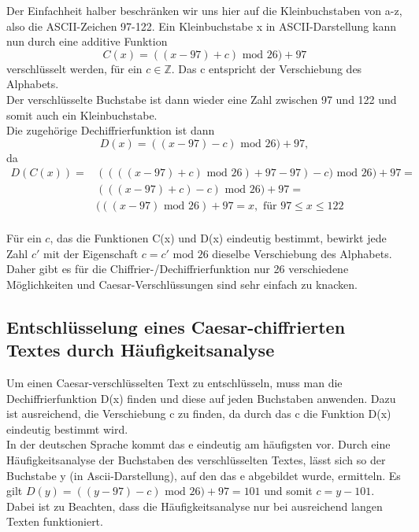 \documentclass[ngerman,12pt]{article}
\def\mod{\mbox{ mod }}
\begin{document}
Der Einfachheit halber beschränken wir uns hier auf die Kleinbuchstaben von a-z, also die ASCII-Zeichen 97-122.
Ein Kleinbuchstabe x in ASCII-Darstellung kann nun durch eine additive Funktion 
\begin{equation*}
C(x)=((x - 97) + c) \mod 26) +97
\end{equation*}
verschlüsselt werden, für ein $c \in \mathbb{Z}$. Das c entspricht der Verschiebung des Alphabets. \\
Der verschlüsselte Buchstabe ist dann wieder eine Zahl zwischen 97 und 122 und somit auch ein Kleinbuchstabe.\\
Die zugehörige Dechiffrierfunktion ist dann 
\begin{equation*}
D(x)=((x - 97) - c) \mod 26) +97,
\end{equation*}
da 
\begin{equation*}
\begin{aligned}
D(C(x)) =  &((((x - 97) + c) \mod 26) +97 - 97) - c) \mod 26) +97 = \\
		   &(((x - 97) + c) - c) \mod 26) +97 = \\
		   &(((x - 97)\mod 26) +97 = x, \text{ für } 97 \leq x \leq 122
\end{aligned}
\end{equation*}
\\
Für ein $c$, das die Funktionen C(x) und D(x) eindeutig bestimmt, bewirkt jede Zahl $c'$ mit der Eigenschaft $c = c' \mod 26$ dieselbe Verschiebung des Alphabets. Daher gibt es für die Chiffrier-/Dechiffrierfunktion nur 26 verschiedene Möglichkeiten und Caesar-Verschlüssungen sind sehr einfach zu knacken.

\newpage
\subsection*{Entschlüsselung eines Caesar-chiffrierten Textes durch Häufigkeitsanalyse}

Um einen Caesar-verschlüsselten Text zu entschlüsseln, muss man die Dechiffrierfunktion D(x) finden und diese auf jeden Buchstaben anwenden. Dazu ist ausreichend, die Verschiebung c zu finden, da durch das c die Funktion D(x) eindeutig bestimmt wird. \\
In der deutschen Sprache kommt das e eindeutig am häufigsten vor. Durch eine Häufigkeitsanalyse der Buchstaben des verschlüsselten Textes, lässt sich so der Buchstabe y (in Ascii-Darstellung), auf den das e abgebildet wurde, ermitteln. Es gilt $D(y) = ((y - 97) - c) \mod 26) +97 = 101$ und somit $c = y - 101$.\\
Dabei ist zu Beachten, dass die Häufigkeitsanalyse nur bei ausreichend langen Texten funktioniert.
\end{document}
